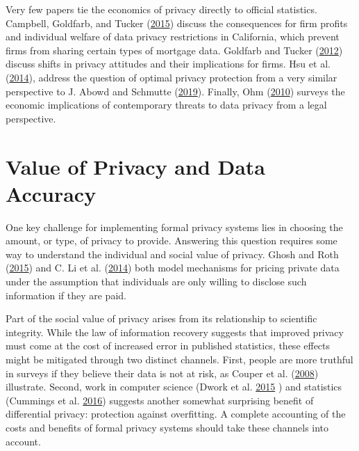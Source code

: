 \documentclass[]{article}
\begin{document}
Very few papers tie the economics of privacy directly to official
statistics. Campbell, Goldfarb, and Tucker
(\protect\hyperlink{ref-Campbell:Privacy:JEMS}{2015}) discuss the
consequences for firm profits and individual welfare of data privacy
restrictions in California, which prevent firms from sharing certain
types of mortgage data. Goldfarb and Tucker
(\protect\hyperlink{ref-Goldfarb:Shifts:AERPP:2012}{2012}) discuss
shifts in privacy attitudes and their implications for firms. Hsu et al.
(\protect\hyperlink{ref-Hsu:EconomicEpsilon:IEEE:2014}{2014}), address
the question of optimal privacy protection from a very similar
perspective to J. Abowd and Schmutte
(\protect\hyperlink{ref-AbowdSchmutte:Privacy:AER}{2019}). Finally, Ohm
(\protect\hyperlink{ref-Ohm:Broken:UCLALR:2010}{2010}) surveys the
economic implications of contemporary threats to data privacy from a
legal perspective.

\hypertarget{value-of-privacy-and-data-accuracy}{\section{Value of
Privacy and Data Accuracy}\label{value-of-privacy-and-data-accuracy}}

One key challenge for implementing formal privacy systems lies in
choosing the amount, or type, of privacy to provide. Answering this
question requires some way to understand the individual and social value
of privacy. Ghosh and Roth
(\protect\hyperlink{ref-Ghosh:Auction:GEB:2015}{2015}) and C. Li et al.
(\protect\hyperlink{ref-Li2014}{2014}) both model mechanisms for pricing
private data under the assumption that individuals are only willing to
disclose such information if they are paid.

Part of the social value of privacy arises from its relationship to
scientific integrity. While the law of information recovery suggests
that improved privacy must come at the cost of increased error in
published statistics, these effects might be mitigated through two
distinct channels. First, people are more truthful in surveys if they
believe their data is not at risk, as Couper et al.
(\protect\hyperlink{ref-couper2008risk}{2008}) illustrate. Second, work
in computer science (Dwork et al.
\protect\hyperlink{ref-Dwork:Generalization:NIPS:2015}{2015} ) and
statistics (Cummings et al.
\protect\hyperlink{ref-cummings:adaptive:corr:2016}{2016}) suggests
another somewhat surprising benefit of differential privacy: protection
against overfitting. A complete accounting of the costs and benefits of
formal privacy systems should take these channels into account.
\end{document}
